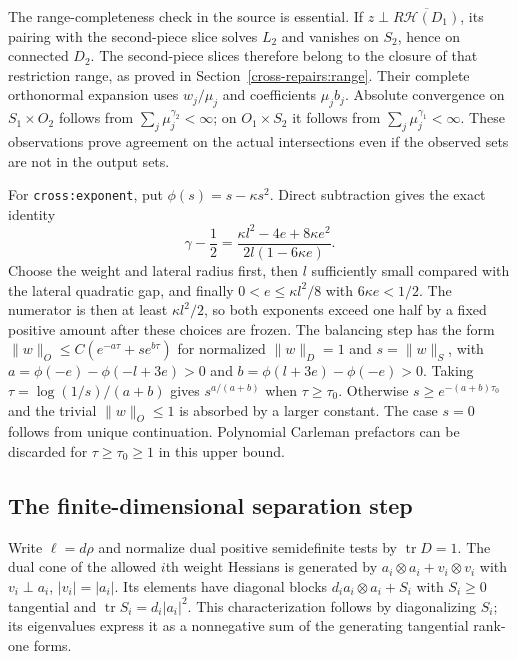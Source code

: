 \documentclass[11pt]{article}
\theoremstyle{definition}
\theoremstyle{remark}
\numberwithin{equation}{section}
\begin{document}
The range-completeness check in the source is essential. If
$z\perp\overline{R\mathcal H(D_1)}$, its pairing with the second-piece
slice solves $L_2$ and vanishes on $S_2$, hence on connected $D_2$.
The second-piece slices therefore belong to the closure of that restriction range, as proved in Section~\ref{cross-repairs:range}. Their complete
orthonormal expansion uses $w_j/\mu_j$ and coefficients $\mu_jb_j$.
Absolute convergence on $S_1\times O_2$ follows from
$\sum_j\mu_j^{\gamma_2}<\infty$; on $O_1\times S_2$ it follows from
$\sum_j\mu_j^{\gamma_1}<\infty$. These observations prove agreement on
the actual intersections even if the observed sets are not in the output sets.

For \texttt{cross:exponent}, put $\phi(s)=s-\kappa s^2$. Direct subtraction
gives the exact identity
\begin{equation}\label{cross-expanded:gamma}
 \gamma-\frac12
 =\frac{\kappa l^2-4e+8\kappa e^2}{2l(1-6\kappa e)}.
\end{equation}
Choose the weight and lateral radius first, then $l$ sufficiently small
compared with the lateral quadratic gap, and finally
$0<e\le\kappa l^2/8$ with $6\kappa e<1/2$.
The numerator is then at least $\kappa l^2/2$, so both exponents exceed
one half by a fixed positive amount after these choices are frozen.
The balancing step has the form
$\|w\|_O\le C(e^{-a\tau}+s e^{b\tau})$ for normalized
$\|w\|_D=1$ and $s=\|w\|_S$, with
$a=\phi(-e)-\phi(-l+3e)>0$ and $b=\phi(l+3e)-\phi(-e)>0$.
Taking $\tau=\log(1/s)/(a+b)$ gives $s^{a/(a+b)}$ when
$\tau\ge\tau_0$. Otherwise $s\ge e^{-(a+b)\tau_0}$ and the trivial
$\|w\|_O\le1$ is absorbed by a larger constant. The case $s=0$ follows
from unique continuation. Polynomial Carleman prefactors can be discarded
for $\tau\ge\tau_0\ge1$ in this upper bound.

\subsection{The finite-dimensional separation step}
\label{cross-expanded:dual}
Write $\ell=d\rho$ and normalize dual positive semidefinite tests by
$\operatorname{tr}D=1$. The dual cone of the allowed $i$th weight Hessians
is generated by $a_i\otimes a_i+v_i\otimes v_i$ with
$v_i\perp a_i$, $|v_i|=|a_i|$. Its elements have diagonal blocks
$d_i a_i\otimes a_i+S_i$ with $S_i\ge0$ tangential and
$\operatorname{tr}S_i=d_i|a_i|^2$. This characterization follows by
diagonalizing $S_i$; its eigenvalues express it as a nonnegative sum
of the generating tangential rank-one forms.
\end{document}
